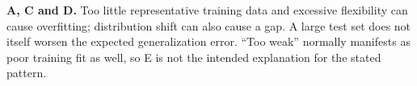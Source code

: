 \textbf{A, C and D.} Too little representative training data and excessive flexibility can cause overfitting; distribution shift can also cause a gap. A large test set does not itself worsen the expected generalization error. “Too weak” normally manifests as poor training fit as well, so E is not the intended explanation for the stated pattern.
